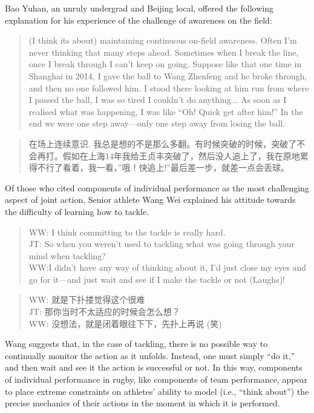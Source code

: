 \begin{CJK}{UTF8}{gbsn}
Bao Yuhan, an unruly undergrad and Beijing local, offered the following explanation for his experience of the challenge of awareness on the field:

  \begin{quote}
    (I think its about) maintaining continuous on-field awareness.  Often I'm never thinking that many steps ahead.  Sometimes when I break the line, once I break through I can't keep on going.  Suppose like that one time in Shanghai in 2014, I gave the ball to Wang Zhenfeng and he broke through, and then no one followed him.  I stood there looking at him run from where I passed the ball, I was so tired I couldn't do anything... As soon as I realised what was happening, I was like ``Oh! Quick get after him!'' In the end we were one step away---only one step away from losing the ball.
  \end{quote}

  \begin{quote}
    在场上连续意识. 我总是想的不是那么多翻。有时候突破的时候，突破了不会再打。假如在上海14年我给王贞丰突破了，然后没人追上了，我在原地累得不行了看着，我一看，''哦！快追上!''最后差一步，就差一点会丢球。
  \end{quote}

Of those who cited components of individual performance as the most challenging aspect of joint action,  Senior athlete Wang Wei explained his attitude towards the difficulty of learning how to tackle.

\begin{quote}
  WW: I think committing to the tackle is really hard. \\
  JT: So when you weren’t used to tackling what was going through your mind when tackling? \\
  WW:I didn’t have any way of thinking about it, I’d just close my eyes and go for it---and just wait and see if I make the tackle or not (Laughs)!
\end{quote}

\begin{quote}
  WW: 就是下扑搂觉得这个很难 \\
  JT: 那你当时不太适应的时候会怎么想？\\
  WW: 没想法，就是闭着眼往下下，先扑上再说 (笑)
\end{quote}

Wang suggests that, in the case of tackling, there is no possible way to continually monitor the action as it unfolds.  Instead, one must simply ``do it,'' and then wait and see it the action is successful or not.  In this way, components of individual performance in rugby, like components of team performance, appear to place extreme constraints on athletes' ability to model (i.e., ``think about'') the precise mechanics of their actions in the moment in which it is performed.


\end{CJK}
